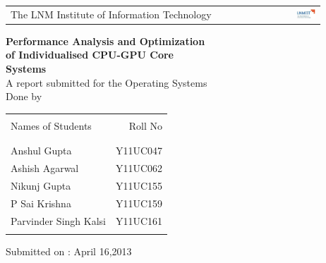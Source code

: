 


\thispagestyle{empty}
\begin{center}

\begin{table}[h]
\centering
\begin{tabular}{lr}
\LARGE The LNM Institute of Information Technology & \includegraphics [width=0.20\textwidth]{lnmiit.jpg}
\end{tabular}
\end{table}
\vspace{1cm}
\vspace{1cm}
{\LARGE \bf Performance Analysis and Optimization }\vspace{.05in}\\
{\LARGE \bf of Individualised CPU-GPU Core }\vspace{.05in}\\
{\LARGE \bf Systems }\vspace{.05in}\\

\vspace{1cm}
{A report submitted for the Operating Systems}\\
\vspace{3cm}
\normalsize Done by \\
\vspace{1cm}
\begin{table}[h]
\centering
\begin{tabular}{lr}\hline \\
Names of Students & Roll No\\ \\ \hline
\\
Anshul Gupta & Y11UC047 \\
Ashish Agarwal & Y11UC062\\ 
Nikunj Gupta & Y11UC155\\
P Sai Krishna & Y11UC159 \\
Parvinder Singh Kalsi & Y11UC161\\ \\ \hline 
\end{tabular}
\end{table}
\vspace{2cm}
{Submitted on : April 16,2013}\\
\vspace{1cm}
\end{center}
